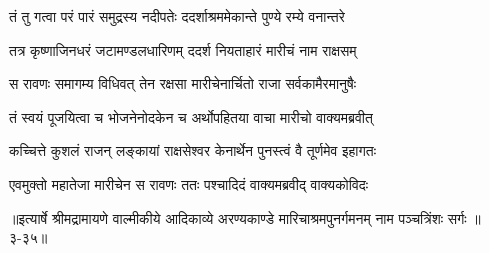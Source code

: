 \twolineshloka
{तं तु गत्वा परं पारं समुद्रस्य नदीपतेः}
{ददर्शाश्रममेकान्ते पुण्ये रम्ये वनान्तरे} %

\twolineshloka
{तत्र कृष्णाजिनधरं जटामण्डलधारिणम्}
{ददर्श नियताहारं मारीचं नाम राक्षसम्} %

\twolineshloka
{स रावणः समागम्य विधिवत् तेन रक्षसा}
{मारीचेनार्चितो राजा सर्वकामैरमानुषैः} %

\twolineshloka
{तं स्वयं पूजयित्वा च भोजनेनोदकेन च}
{अर्थोपहितया वाचा मारीचो वाक्यमब्रवीत्} %

\twolineshloka
{कच्चित्ते कुशलं राजन् लङ्कायां राक्षसेश्वर}
{केनार्थेन पुनस्त्वं वै तूर्णमेव इहागतः} %

\twolineshloka
{एवमुक्तो महातेजा मारीचेन स रावणः}
{ततः पश्चादिदं वाक्यमब्रवीद् वाक्यकोविदः} %


॥इत्यार्षे श्रीमद्रामायणे वाल्मीकीये आदिकाव्ये अरण्यकाण्डे मारिचाश्रमपुनर्गमनम् नाम पञ्चत्रिंशः सर्गः ॥३-३५॥
